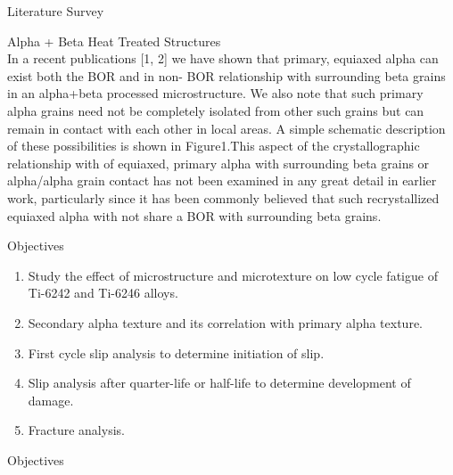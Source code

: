 \documentclass[10pt]{beamer}
\begin{document}
{%
\begin{frame}[fragile]{Literature Survey}

Alpha + Beta Heat Treated Structures \\
In a recent publications [1, 2] we have shown that primary, equiaxed alpha can exist both the BOR and in non- BOR relationship with surrounding beta grains in an alpha+beta processed microstructure. We also note that such primary alpha grains need not be completely isolated from other such grains but can remain in contact with each other in local areas. A simple schematic description of these possibilities is shown in Figure1.This aspect of the crystallographic relationship with of equiaxed, primary alpha with surrounding beta grains or alpha/alpha grain contact has not been examined in any great detail in earlier work, particularly since it has been commonly believed that such recrystallized equiaxed alpha with not share a BOR with surrounding beta grains.

\end{frame}
}

\begin{frame}[fragile]{Objectives}

\begin{enumerate}
\item Study the effect of microstructure and microtexture on low cycle fatigue of Ti-6242 and Ti-6246 alloys.
\item Secondary alpha texture and its correlation with primary alpha texture.
\item First cycle slip analysis to determine initiation of slip.
\item Slip analysis after quarter-life or half-life to determine development of damage.
\item Fracture analysis.
\end{enumerate}

\end{frame}

{%
\begin{frame}[fragile]{Objectives}



\end{frame}
}
\end{document}
